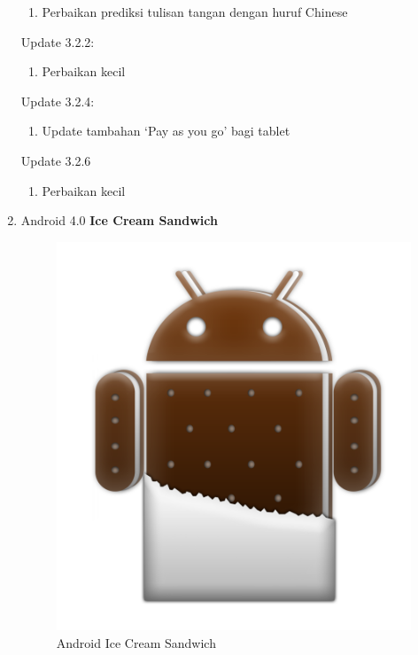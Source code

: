 \begin{enumerate}
\begin{enumerate}
    \item Perbaikan prediksi tulisan tangan dengan huruf Chinese
\end{enumerate}
Update 3.2.2:
\begin{enumerate}
    \item Perbaikan kecil
\end{enumerate}
Update 3.2.4:
\begin{enumerate}
    \item Update tambahan ‘Pay as you go’ bagi tablet
\end{enumerate}
Update 3.2.6
\begin{enumerate}
    \item Perbaikan kecil 
\end{enumerate}

\item Android 4.0 \textbf{Ice Cream Sandwich}\\
\begin{figure}[!htbp]
    \centering
    \includegraphics[scale = 0.1]{pictures/android-ice-cream-sandwich.png}
    \caption{Android Ice Cream Sandwich}
    \label{}
\end{figure}


\end{enumerate}

